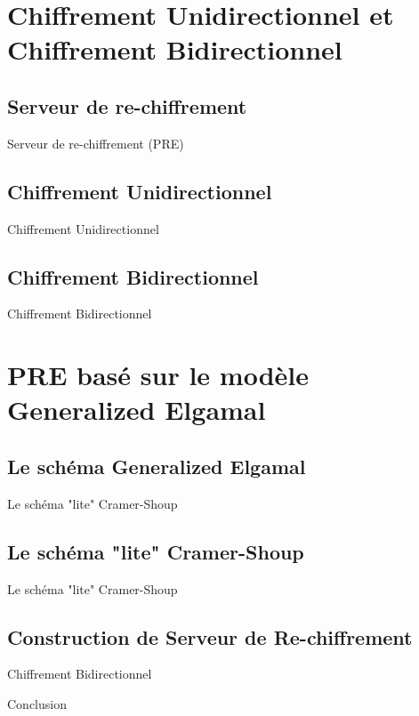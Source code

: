 \documentclass{beamer}
\begin{document}
\section{Chiffrement Unidirectionnel et Chiffrement Bidirectionnel}
\subsection{Serveur de re-chiffrement}
\begin{frame}{Serveur de re-chiffrement (PRE)}
	
\end{frame}

\subsection{Chiffrement Unidirectionnel}
\begin{frame}{Chiffrement Unidirectionnel}
	
\end{frame}

\subsection{Chiffrement Bidirectionnel}
\begin{frame}{Chiffrement Bidirectionnel}
	
\end{frame}

\section{PRE basé sur le modèle Generalized Elgamal}
\subsection{Le schéma Generalized Elgamal}
\begin{frame}{Le schéma "lite" Cramer-Shoup}
	
\end{frame}

\subsection{Le schéma "lite" Cramer-Shoup}
\begin{frame}{Le schéma "lite" Cramer-Shoup}
	
\end{frame}

\subsection{Construction de Serveur de Re-chiffrement}
\begin{frame}{Chiffrement Bidirectionnel}
	
\end{frame}




\begin{frame}{Conclusion}
\end{frame}
\end{document}
